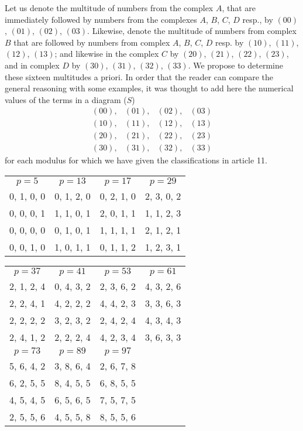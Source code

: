 \documentclass[twoside,12pt]{memoir}
\begin{document}
Let us denote the multitude of numbers from the complex \(A\), that are immediately followed by numbers from the complexes \(A\), \(B\), \(C\), \(D\) resp{.}, by \((00)\), \((01)\), \((02)\), \((03)\).  Likewise, denote the multitude of numbers from complex \(B\) that are followed by numbers from complex \(A\), \(B\), \(C\), \(D\) resp{.} by \((10)\), \((11)\), \((12)\), \((13)\); and likewise in the complex \(C\) by \((20)\), \((21)\), \((22)\), \((23)\), and in complex \(D\) by \((30)\), \((31)\), \((32)\), \((33)\). We propose to determine these sixteen multitudes a priori. In order that the reader can compare the general reasoning with some examples, it was thought to add here the numerical values of the terms in a diagram (\(S\))
\[\begin{array}{llll}
(00), & (01), & (02), & (03) \\
(10), & (11), & (12), & (13) \\
(20), & (21), & (22), & (23) \\
(30), & (31), & (32), & (33)
\end{array}\]
for each modulus for which we have given the classifications in article 11.
\begin{center}\begin{tabular}{c|c|c|c}
\(p=5\) & \(p=13\) & \(p=17\) & \(p=29\) \\
0, 1, 0, 0 & 0, 1, 2, 0 & 0, 2, 1, 0 & 2, 3, 0, 2 \\
0, 0, 0, 1 & 1, 1, 0, 1 & 2, 0, 1, 1 & 1, 1, 2, 3 \\
0, 0, 0, 0 & 0, 1, 0, 1 & 1, 1, 1, 1 & 2, 1, 2, 1 \\
0, 0, 1, 0 & 1, 0, 1, 1 & 0, 1, 1, 2 & 1, 2, 3, 1
\end{tabular}\pagebreak%

\begin{tabular}{c|c|c|c}
\(p=37\) & \(p=41\) & \(p=53\) & \(p=61\) \\
2, 1, 2, 4 & 0, 4, 3, 2 & 2, 3, 6, 2 & 4, 3, 2, 6 \\
2, 2, 4, 1 & 4, 2, 2, 2 & 4, 4, 2, 3 & 3, 3, 6, 3 \\
2, 2, 2, 2 & 3, 2, 3, 2 & 2, 4, 2, 4 & 4, 3, 4, 3 \\
2, 4, 1, 2 & 2, 2, 2, 4 & 4, 2, 3, 4 & 3, 6, 3, 3 \\
\hline
\(p=73\) & \(p=89\) & \(p=97\)   \\
5, 6, 4, 2 & 3, 8, 6, 4 & 2, 6, 7, 8   \\
6, 2, 5, 5 & 8, 4, 5, 5 & 6, 8, 5, 5   \\
4, 5, 4, 5 & 6, 5, 6, 5 & 7, 5, 7, 5   \\
2, 5, 5, 6 & 4, 5, 5, 8 & 8, 5, 5, 6   \\
\end{tabular}
\end{center}
\end{document}
